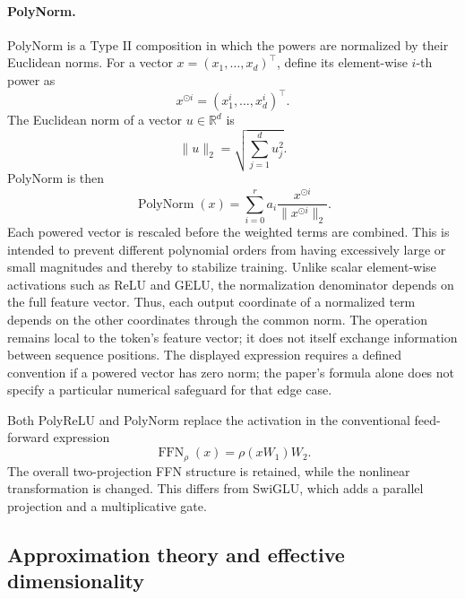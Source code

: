 \paragraph{PolyNorm.}
PolyNorm is a Type II composition in which the powers are normalized
by their Euclidean norms. For a vector
\(x=(x_1,\ldots,x_d)^{\top}\), define its element-wise \(i\)-th power
as
\begin{equation}
    x^{\odot i}
    =
    (x_1^i,\ldots,x_d^i)^{\top}.
    \label{eq:act-elementwise-power}
\end{equation}
The Euclidean norm of a vector \(u\in\mathbb{R}^d\) is
\begin{equation}
    \|u\|_2
    =
    \sqrt{\sum_{j=1}^{d}u_j^2}.
    \label{eq:act-euclidean-norm}
\end{equation}
PolyNorm is then
\begin{equation}
    \operatorname{PolyNorm}(x)
    =
    \sum_{i=0}^{r}
    a_i
    \frac{x^{\odot i}}{\|x^{\odot i}\|_2}.
    \label{eq:act-polynorm}
\end{equation}
Each powered vector is rescaled before the weighted terms are combined.
This is intended to prevent different polynomial orders from having
excessively large or small magnitudes and thereby to stabilize training.
Unlike scalar element-wise activations such as ReLU and GELU, the
normalization denominator depends on the full feature vector. Thus,
each output coordinate of a normalized term depends on the other
coordinates through the common norm. The operation remains local to
the token's feature vector; it does not itself exchange information
between sequence positions. The displayed expression requires a
defined convention if a powered vector has zero norm; the paper's
formula alone does not specify a particular numerical safeguard for
that edge case.

Both PolyReLU and PolyNorm replace the activation in the conventional
feed-forward expression
\begin{equation}
    \operatorname{FFN}_{\rho}(x)=\rho(xW_1)W_2.
    \label{eq:act-polycom-ffn}
\end{equation}
The overall two-projection FFN structure is retained, while the
nonlinear transformation is changed. This differs from SwiGLU, which
adds a parallel projection and a multiplicative gate.

\subsection{Approximation theory and effective dimensionality}
\label{subsec:act-theory}

